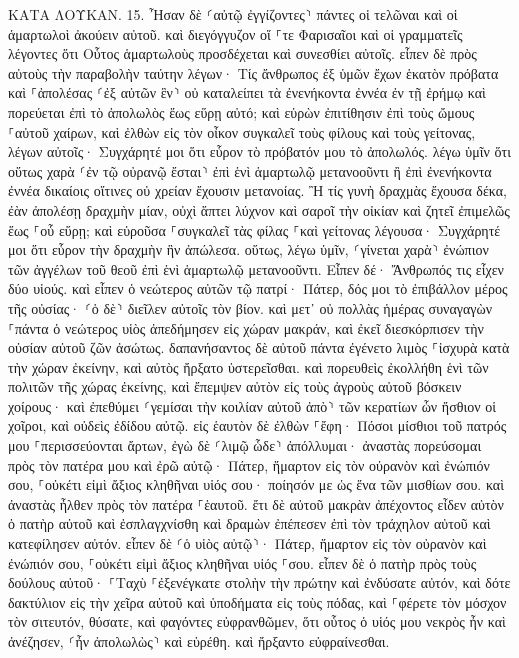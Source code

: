 \documentclass[twoside, 9pt]{extreport}
\begin{document}
ΚΑΤΑ ΛΟΥΚΑΝ.
15.
Ἦσαν δὲ ⸂αὐτῷ ἐγγίζοντες⸃ πάντες οἱ τελῶναι καὶ οἱ ἁμαρτωλοὶ ἀκούειν αὐτοῦ. 
καὶ διεγόγγυζον οἵ ⸀τε Φαρισαῖοι καὶ οἱ γραμματεῖς λέγοντες ὅτι Οὗτος ἁμαρτωλοὺς προσδέχεται καὶ συνεσθίει αὐτοῖς. 
εἶπεν δὲ πρὸς αὐτοὺς τὴν παραβολὴν ταύτην λέγων· 
Τίς ἄνθρωπος ἐξ ὑμῶν ἔχων ἑκατὸν πρόβατα καὶ ⸀ἀπολέσας ⸂ἐξ αὐτῶν ἓν⸃ οὐ καταλείπει τὰ ἐνενήκοντα ἐννέα ἐν τῇ ἐρήμῳ καὶ πορεύεται ἐπὶ τὸ ἀπολωλὸς ἕως εὕρῃ αὐτό; 
καὶ εὑρὼν ἐπιτίθησιν ἐπὶ τοὺς ὤμους ⸀αὐτοῦ χαίρων, 
καὶ ἐλθὼν εἰς τὸν οἶκον συγκαλεῖ τοὺς φίλους καὶ τοὺς γείτονας, λέγων αὐτοῖς· Συγχάρητέ μοι ὅτι εὗρον τὸ πρόβατόν μου τὸ ἀπολωλός. 
λέγω ὑμῖν ὅτι οὕτως χαρὰ ⸂ἐν τῷ οὐρανῷ ἔσται⸃ ἐπὶ ἑνὶ ἁμαρτωλῷ μετανοοῦντι ἢ ἐπὶ ἐνενήκοντα ἐννέα δικαίοις οἵτινες οὐ χρείαν ἔχουσιν μετανοίας. 
Ἢ τίς γυνὴ δραχμὰς ἔχουσα δέκα, ἐὰν ἀπολέσῃ δραχμὴν μίαν, οὐχὶ ἅπτει λύχνον καὶ σαροῖ τὴν οἰκίαν καὶ ζητεῖ ἐπιμελῶς ἕως ⸀οὗ εὕρῃ; 
καὶ εὑροῦσα ⸀συγκαλεῖ τὰς φίλας ⸀καὶ γείτονας λέγουσα· Συγχάρητέ μοι ὅτι εὗρον τὴν δραχμὴν ἣν ἀπώλεσα. 
οὕτως, λέγω ὑμῖν, ⸂γίνεται χαρὰ⸃ ἐνώπιον τῶν ἀγγέλων τοῦ θεοῦ ἐπὶ ἑνὶ ἁμαρτωλῷ μετανοοῦντι. 
Εἶπεν δέ· Ἄνθρωπός τις εἶχεν δύο υἱούς. 
καὶ εἶπεν ὁ νεώτερος αὐτῶν τῷ πατρί· Πάτερ, δός μοι τὸ ἐπιβάλλον μέρος τῆς οὐσίας· ⸂ὁ δὲ⸃ διεῖλεν αὐτοῖς τὸν βίον. 
καὶ μετ᾽ οὐ πολλὰς ἡμέρας συναγαγὼν ⸀πάντα ὁ νεώτερος υἱὸς ἀπεδήμησεν εἰς χώραν μακράν, καὶ ἐκεῖ διεσκόρπισεν τὴν οὐσίαν αὐτοῦ ζῶν ἀσώτως. 
δαπανήσαντος δὲ αὐτοῦ πάντα ἐγένετο λιμὸς ⸀ἰσχυρὰ κατὰ τὴν χώραν ἐκείνην, καὶ αὐτὸς ἤρξατο ὑστερεῖσθαι. 
καὶ πορευθεὶς ἐκολλήθη ἑνὶ τῶν πολιτῶν τῆς χώρας ἐκείνης, καὶ ἔπεμψεν αὐτὸν εἰς τοὺς ἀγροὺς αὐτοῦ βόσκειν χοίρους· 
καὶ ἐπεθύμει ⸂γεμίσαι τὴν κοιλίαν αὐτοῦ ἀπὸ⸃ τῶν κερατίων ὧν ἤσθιον οἱ χοῖροι, καὶ οὐδεὶς ἐδίδου αὐτῷ. 
εἰς ἑαυτὸν δὲ ἐλθὼν ⸀ἔφη· Πόσοι μίσθιοι τοῦ πατρός μου ⸀περισσεύονται ἄρτων, ἐγὼ δὲ ⸂λιμῷ ὧδε⸃ ἀπόλλυμαι· 
ἀναστὰς πορεύσομαι πρὸς τὸν πατέρα μου καὶ ἐρῶ αὐτῷ· Πάτερ, ἥμαρτον εἰς τὸν οὐρανὸν καὶ ἐνώπιόν σου, 
⸀οὐκέτι εἰμὶ ἄξιος κληθῆναι υἱός σου· ποίησόν με ὡς ἕνα τῶν μισθίων σου. 
καὶ ἀναστὰς ἦλθεν πρὸς τὸν πατέρα ⸀ἑαυτοῦ. ἔτι δὲ αὐτοῦ μακρὰν ἀπέχοντος εἶδεν αὐτὸν ὁ πατὴρ αὐτοῦ καὶ ἐσπλαγχνίσθη καὶ δραμὼν ἐπέπεσεν ἐπὶ τὸν τράχηλον αὐτοῦ καὶ κατεφίλησεν αὐτόν. 
εἶπεν δὲ ⸂ὁ υἱὸς αὐτῷ⸃· Πάτερ, ἥμαρτον εἰς τὸν οὐρανὸν καὶ ἐνώπιόν σου, ⸀οὐκέτι εἰμὶ ἄξιος κληθῆναι υἱός ⸀σου. 
εἶπεν δὲ ὁ πατὴρ πρὸς τοὺς δούλους αὐτοῦ· ⸀Ταχὺ ⸀ἐξενέγκατε στολὴν τὴν πρώτην καὶ ἐνδύσατε αὐτόν, καὶ δότε δακτύλιον εἰς τὴν χεῖρα αὐτοῦ καὶ ὑποδήματα εἰς τοὺς πόδας, 
καὶ ⸀φέρετε τὸν μόσχον τὸν σιτευτόν, θύσατε, καὶ φαγόντες εὐφρανθῶμεν, 
ὅτι οὗτος ὁ υἱός μου νεκρὸς ἦν καὶ ἀνέζησεν, ⸂ἦν ἀπολωλὼς⸃ καὶ εὑρέθη. καὶ ἤρξαντο εὐφραίνεσθαι. 
\end{document}
